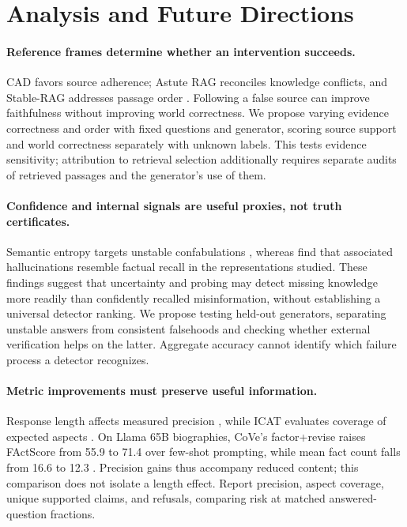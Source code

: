 \section{Analysis and Future Directions}\label{sec:analysis}


\paragraph{Reference frames determine whether an intervention succeeds.}

CAD favors source adherence; Astute RAG reconciles knowledge conflicts, and Stable-RAG addresses passage order \citep{shi-etal-2024-trusting,wang-etal-2025-astute,zhang-etal-2026-stable}. Following a false source can improve faithfulness without improving world correctness. We propose varying evidence correctness and order with fixed questions and generator, scoring source support and world correctness separately with unknown labels. This tests evidence sensitivity; attribution to retrieval selection additionally requires separate audits of retrieved passages and the generator's use of them.

\paragraph{Confidence and internal signals are useful proxies, not truth certificates.}

Semantic entropy targets unstable confabulations \citep{extsemanticentropy2024}, whereas \citet{cheang-etal-2026-llms} find that associated hallucinations resemble factual recall in the representations studied. These findings suggest that uncertainty and probing may detect missing knowledge more readily than confidently recalled misinformation, without establishing a universal detector ranking. We propose testing held-out generators, separating unstable answers from consistent falsehoods and checking whether external verification helps on the latter. Aggregate accuracy cannot identify which failure process a detector recognizes.

\paragraph{Metric improvements must preserve useful information.}

Response length affects measured precision \citep{zhao-etal-2025-response}, while ICAT evaluates coverage of expected aspects \citep{samarinas-etal-2025-beyond}. On Llama 65B biographies, CoVe's factor+revise raises FActScore from 55.9 to 71.4 over few-shot prompting, while mean fact count falls from 16.6 to 12.3 \citep{dhuliawala-etal-2024-chain}. Precision gains thus accompany reduced content; this comparison does not isolate a length effect. Report precision, aspect coverage, unique supported claims, and refusals, comparing risk at matched answered-question fractions.

